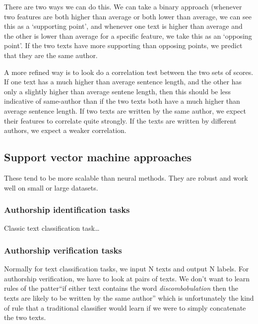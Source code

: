 There are two ways we can do this. We can take a binary approach
(whenever two features are both higher than average or both lower than
average, we can see this as a `supporting point', and whenever one text
is higher than average and the other is lower than average for a
specific feature, we take this as an `opposing point'. If the two texts
have more supporting than opposing points, we predict that they are the
same author.

A more refined way is to look do a correlation test between the two sets
of scores. If one text has a much higher than average sentence length,
and the other has only a slightly higher than average sentene length,
then this should be less indicative of same-author than if the two texts
both have a much higher than average sentence length. If two texts are
written by the same author, we expect their features to correlate quite
strongly. If the texts are written by different authors, we expect a
weaker correlation.

\subsection{Support vector machine
approaches}\label{support-vector-machine-approaches}

These tend to be more scalable than neural methods. They are robust and
work well on small or large datasets.

\subsubsection{Authorship identification
tasks}\label{authorship-identification-tasks-1}

Classic text classification task\ldots{}

\subsubsection{Authorship verification
tasks}\label{authorship-verification-tasks-1}

Normally for text classification tasks, we input N texts and output N
labels. For authorship verification, we have to look at pairs of texts.
We don't want to learn rules of the patter``if either text contains the
word \emph{discombobulation} then the texts are likely to be written by
the same author'' which is unfortunately the kind of rule that a
traditional classifier would learn if we were to simply concatenate the
two texts.


